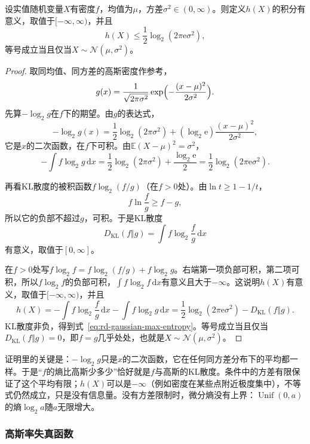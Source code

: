 \begin{theorem}[固定方差的熵上界]
\label{thm:rd-gaussian-max-entropy}
设实值随机变量$X$有密度$f$，均值为$\mu$，方差$\sigma^{2}\in(0,\infty)$。则定义$h(X)$的积分有意义，取值于$[-\infty,\infty)$，并且
\begin{equation}
  h(X)\leq\frac12\log_2(2\pi\mathrm{e}\sigma^{2}),
  \label{eq:rd-gaussian-max-entropy}
\end{equation}
等号成立当且仅当$X\sim\mathcal{N}(\mu,\sigma^{2})$。
\end{theorem}

\begin{proof}
取同均值、同方差的高斯密度作参考，
\[
  g(x)=\frac{1}{\sqrt{2\pi\sigma^{2}}}\exp\Bigl(-\frac{(x-\mu)^{2}}{2\sigma^{2}}\Bigr).
\]
先算$-\log_2g$在$f$下的期望。由$g$的表达式，
\[
  -\log_2g(x)=\frac12\log_2(2\pi\sigma^{2})+(\log_2\mathrm{e})\frac{(x-\mu)^{2}}{2\sigma^{2}},
\]
它是$x$的二次函数，在$f$下可积。由$\mathbb{E}(X-\mu)^{2}=\sigma^{2}$，
\[
  -\int f\log_2g\,\mathrm{d}x=\frac12\log_2(2\pi\sigma^{2})+\frac{\log_2\mathrm{e}}{2}=\frac12\log_2(2\pi\mathrm{e}\sigma^{2}).
\]

再看KL散度的被积函数$f\log_2(f/g)$（在$f>0$处）。由$\ln t\geq1-1/t$，
\[
  f\ln\frac{f}{g}\geq f-g ,
\]
所以它的负部不超过$g$，可积。于是KL散度
\[
  D_{\mathrm{KL}}(f\Vert g)=\int f\log_2\frac{f}{g}\,\mathrm{d}x
\]
有意义，取值于$[0,\infty]$。

在$f>0$处写$f\log_2f=f\log_2(f/g)+f\log_2g$。右端第一项负部可积，第二项可积，所以$f\log_2f$的负部可积，$\int f\log_2f\,\mathrm{d}x$有意义且大于$-\infty$。这说明$h(X)$有意义，取值于$[-\infty,\infty)$，并且
\[
  h(X)=-\int f\log_2\frac{f}{g}\,\mathrm{d}x-\int f\log_2g\,\mathrm{d}x=\frac12\log_2(2\pi\mathrm{e}\sigma^{2})-D_{\mathrm{KL}}(f\Vert g).
\]
KL散度非负，得到式~\eqref{eq:rd-gaussian-max-entropy}。等号成立当且仅当$D_{\mathrm{KL}}(f\Vert g)=0$，即$f=g$几乎处处，也就是$X\sim\mathcal{N}(\mu,\sigma^{2})$。
\end{proof}

证明里的关键是：$-\log_2g$只是$x$的二次函数，它在任何同方差分布下的平均都一样。于是“$f$的熵比高斯少多少”恰好就是$f$与高斯的KL散度。条件中的方差有限保证了这个平均有限；$h(X)$可以是$-\infty$（例如密度在某些点附近极度集中），不等式仍然成立，只是没有信息量。没有方差限制时，微分熵没有上界：$\operatorname{Unif}(0,a)$的熵$\log_2a$随$a$无限增大。

\subsubsection{高斯率失真函数}
\label{sec:rd-gaussian-rd}

